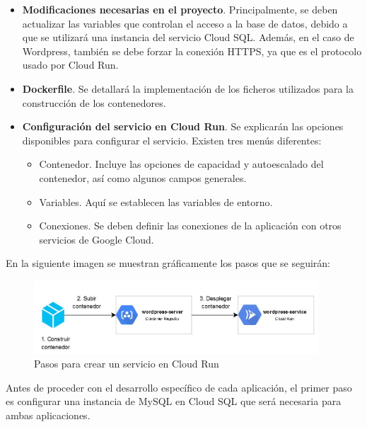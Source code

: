 \begin{itemize}
    \item \textbf{Modificaciones necesarias en el proyecto}. Principalmente, se deben actualizar las variables que controlan el acceso a la base de datos, debido a que se utilizará una instancia del servicio Cloud SQL. Además, en el caso de Wordpress, también se debe forzar la conexión HTTPS, ya que es el protocolo usado por Cloud Run.
    \item \textbf{Dockerfile}. Se detallará la implementación de los ficheros utilizados para la construcción de los contenedores.
    \item \textbf{Configuración del servicio en Cloud Run}. Se explicarán las opciones disponibles para configurar el servicio. Existen tres menús diferentes:
    \begin{itemize}
        \item Contenedor. Incluye las opciones de capacidad y autoescalado del contenedor, así como algunos campos generales.
        \item Variables. Aquí se establecen las variables de entorno.
        \item Conexiones. Se deben definir las conexiones de la aplicación con otros servicios de Google Cloud.
    \end{itemize}
\end{itemize}

En la siguiente imagen se muestran gráficamente los pasos que se seguirán:

\begin{figure}[ht]
    	\begin{center}
    		\includegraphics[width = 0.95\textwidth]{Figuras/Despliegue.JPG}
    	\end{center}
    	\caption{\label{fig:deployCloudRun} Pasos para crear un servicio en Cloud Run}
\end{figure}

Antes de proceder con el desarrollo específico de cada aplicación, el primer paso es configurar una instancia de MySQL en Cloud SQL que será necesaria para ambas aplicaciones.

\newpage

